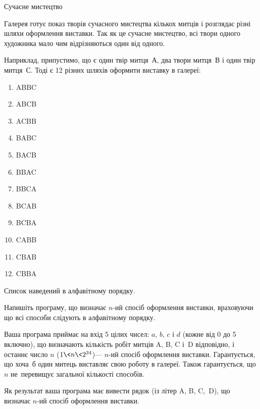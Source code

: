 \begin{problemAllDefault}{Сучасне мистецтво}

Галерея готує показ творів сучасного мистецтва кількох митців і розглядає різні шляхи оформлення виставки. Так як це сучасне мистецтво, всі твори одного художника мало чим відрізняються один від одного.

Наприклад, припустимо, що є один твір митця~А, два твори митця~В і один твір митця~С. Тоді є 12 різних шляхів оформити виставку в галереї:

\vspace{-0.5\baselineskip}

\begin{multicols}{\fi}
\begin{enumerate}
\item
ABBC
\item
ABCB
\item
ACBB
\item
BABC
\item
BACB
\item
BBAC
\item
BBCA
\item
BCAB
\item
BCBA
\item
CABB
\item
CBAB
\item
CBBA
\end{enumerate}
\end{multicols}

\vspace{-0.5\baselineskip}

Список наведений в алфавітному порядку.

Напишіть програму, що визначає $n$-ий спосіб оформлення виставки, враховуючи що всі способи слідують в алфавітному порядку.

Ваша програма приймає на вхід 5 цілих чисел: $a$, $b$, $c$ і $d$ (кожне від 0 до 5 включно), що визначають кількість робіт митців A, B, C і~D відповідно, і останнє число $n$ ($1{\<}n{\<}2^{34}$)\nolinebreak[3] --- $n$-ий спосіб оформлення виставки. Гарантується, що хоча~б один митець виставляє свою роботу в галереї. Також гарантується, що $n$ не~перевищує загальної кількості способів.

Як результат ваша програма має вивести рядок (із літер A, B, C,~D), що визначає $n$-ий спосіб оформлення виставки.

\Example
\begin{exampleSimple}{5em}{3em}%
%
\end{exampleSimple}

\end{problemAllDefault}
